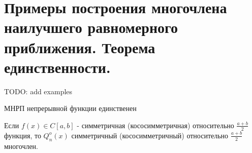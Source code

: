 \section{Примеры построения многочлена наилучшего равномерного приближения. Теорема единственности.}
\begin{example}
  TODO: add examples
\end{example}
\begin{theorem}
  МНРП непрерывной функции единственен
\end{theorem}
\begin{corollary}
  Если $f(x)\in C[a,b]$ - симметричная (кососимметричная) относительно $\frac{a+b}{2}$ функция, то
  $Q_n^o(x)$ симметричный (кососимметричный) относительно $\frac{a+b}{2}$ многочлен.
\end{corollary}
